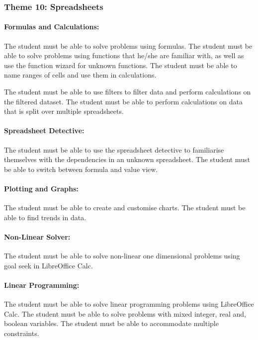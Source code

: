         \subsubsection{Theme 10: Spreadsheets}
            \paragraph{Formulas and Calculations:}
                The student must be able to solve problems using formulas. The
                student must be able to solve problems using functions that
                he/she are familiar with, as well as use the function wizard
                for unknown functions. The student must be able to name ranges
                of cells and use them in calculations.

                The student must be able to use filters to filter data and
                perform calculations on the filtered dataset. The student must
                be able to perform calculations on data that is split over
                multiple spreadsheets.

            \paragraph{Spreadsheet Detective:}
                The student must be able to use the spreadsheet detective to
                familiarise themselves with the dependencies in an unknown
                spreadsheet. The student must be able to switch between formula
                and value view.

            \paragraph{Plotting and Graphs:}
                The student must be able to create and customise charts. The
                student must be able to find trends in data.

            \paragraph{Non-Linear Solver:}
                The student must be able to solve non-linear one dimensional
                problems using goal seek in LibreOffice Calc.

            \paragraph{Linear Programming:}
                The student must be able to solve linear programming problems
                using LibreOffice Calc. The student must be able to solve
                problems with mixed integer, real and, boolean variables. The
                student must be able to accommodate multiple constraints.

